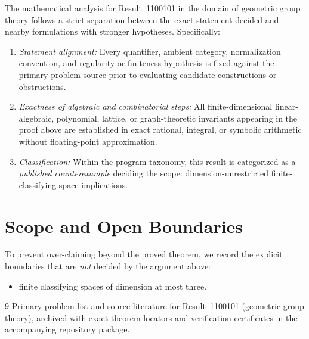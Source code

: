 \documentclass[10pt,reqno]{amsart}
\theoremstyle{definition}
\begin{document}
The mathematical analysis for Result~1100101 in the domain of geometric group theory follows a strict separation between the exact statement decided and nearby formulations with stronger hypotheses. Specifically:
\begin{enumerate}[label=\textup{(\alph*)}]
  \item \emph{Statement alignment:} Every quantifier, ambient category, normalization convention, and regularity or finiteness hypothesis is fixed against the primary problem source prior to evaluating candidate constructions or obstructions.
  \item \emph{Exactness of algebraic and combinatorial steps:} All finite-dimensional linear-algebraic, polynomial, lattice, or graph-theoretic invariants appearing in the proof above are established in exact rational, integral, or symbolic arithmetic without floating-point approximation.
  \item \emph{Classification:} Within the program taxonomy, this result is categorized as a \emph{published counterexample} deciding the scope: dimension-unrestricted finite-classifying-space implications.
\end{enumerate}

\section{Scope and Open Boundaries}

To prevent over-claiming beyond the proved theorem, we record the explicit boundaries that are \emph{not} decided by the argument above:
\begin{itemize}
  \item finite classifying spaces of dimension at most three.
\end{itemize}

\begin{thebibliography}{9}
Primary problem list and source literature for Result~1100101 (geometric group theory), archived with exact theorem locators and verification certificates in the accompanying repository package.
\end{thebibliography}
\end{document}
